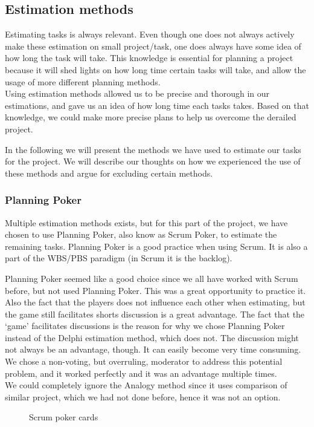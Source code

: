 \subsection{Estimation methods}
Estimating tasks is always relevant. Even though one does not always actively make these estimation on small project/task, one does always have some idea of how long the task will take. This knowledge is essential for planning a project because it will shed lights on how long time certain tasks will take, and allow the usage of more different planning methods.\\
Using estimation methods allowed us to be precise and thorough in our estimations, and gave us an idea of how long time each tasks takes. Based on that knowledge, we could make more precise plans to help us overcome the derailed project.

In the following we will present the methods we have used to estimate our tasks for the project. We will describe our thoughts on how we experienced the use of these methods and argue for excluding certain methods.
\subsubsection{Planning Poker}
Multiple estimation methods exists, but for this part of the project, we have chosen to use Planning Poker, also know as Scrum Poker, to estimate the remaining tasks. Planning Poker is a good practice when using Scrum. It is also a part of the WBS/PBS paradigm (in Scrum it is the backlog).

Planning Poker seemed like a good choice since we all have worked with Scrum before, but not used Planning Poker. This was a great opportunity to practice it. Also the fact that the players does not influence each other when estimating, but the game still facilitates shorts discussion is a great advantage. The fact that the `game' facilitates discussions is the reason for why we chose Planning Poker instead of the Delphi estimation method, which does not. The discussion might not always be an advantage, though. It can easily become very time consuming. We chose a non-voting, but overruling, moderator to address this potential problem, and it worked perfectly and it was an advantage multiple times.\\
We could completely ignore the Analogy method since it uses comparison of similar project, which we had not done before, hence it was not an option.

\begin{figure}[H]
  \caption{Scrum poker cards}
  \label{scrumPokerCards}
\end{figure}

